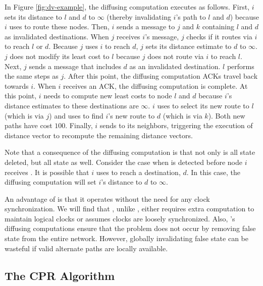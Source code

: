 
In Figure \ref{fig:dv-example}, the diffusing computation executes as follows. First, $i$ sets its distance to $l$ and $d$ to $\infty$ (thereby invalidating $i$'s path to $l$ and $d$)
because $i$ uses \bad to route these nodes. Then, $i$ sends a message to $j$ and $k$ containing $l$ and $d$ as invalidated destinations.
When $j$ receives $i$'s message, $j$ checks if it routes via $i$ to reach $l$ or $d$. Because $j$ uses $i$ to reach $d$, $j$ sets its distance estimate to $d$ to $\infty$. 
$j$ does not modify its least cost to $l$ because $j$ does not route via $i$ to reach $l$. Next, $j$ sends a message that includes $d$ as an invalidated destination.
$l$ performs the same steps as $j$. After this point, the diffusing computation ACKs travel back towards $i$. When $i$ receives an ACK, the diffusing computation is complete. At this
point, $i$ needs to compute new least costs to node $l$ and $d$ because $i$'s distance estimates to these destinations are $\infty$. 
$i$ uses \dmatrixi to select its new route to $l$ (which is via $j$) and uses \dmatrixi to find $i$'s new route to $d$ (which is via $k$). Both new paths have cost $100$. Finally,
$i$ sends \minvi to its neighbors, triggering the execution of distance vector to recompute the remaining distance vectors.

Note that a consequence of the diffusing computation is that not only is all \badvector state deleted, but all \oldvector state as well.  
Consider the case when \bad is detected before node $i$ receives \badvectors.
It is possible that $i$ uses \oldvector to reach a destination, $d$. In this case, the diffusing computation will set $i$'s distance to $d$ to $\infty$.

An advantage of \purge is that it operates without the need for any clock synchronization.  We will find that \cprs, unlike \purges, either requires extra computation to maintain logical clocks or
assumes clocks are loosely synchronized. %
Also, \purges's diffusing computations ensure that the \infinity problem does not occur by removing
false state from the entire network. However, globally invalidating false state can be wasteful if valid alternate paths are locally available. 


\subsection{The CPR Algorithm}
\label{subsec:cpr}

